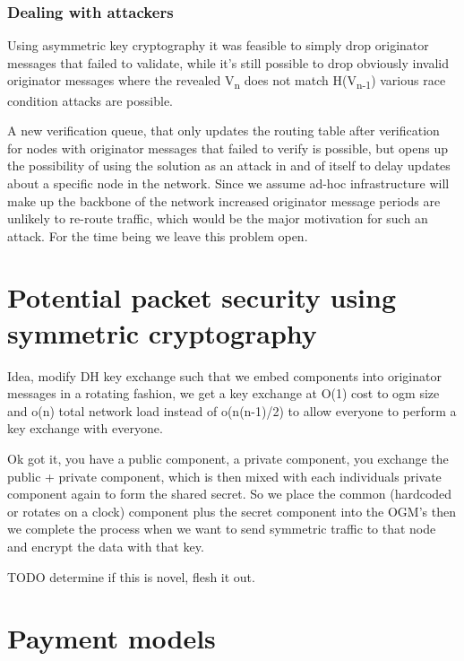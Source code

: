 \documentclass[11pt]{article}
\begin{document}
               \subsubsection{Dealing with attackers}
               
                      Using asymmetric key cryptography it was feasible to simply drop originator messages that failed to validate, while it's still possible to drop obviously invalid originator messages where the revealed V\textsubscript{n} does not match H(V\textsubscript{n-1}) various race condition attacks are possible. 
                          
                      A new verification queue, that only updates the routing table after verification for nodes with originator messages that failed to verify is possible, but opens up the possibility of using the solution as an attack in and of itself to delay updates about a specific node in the network. Since we assume ad-hoc infrastructure will make up the backbone of the network increased originator message periods are unlikely to re-route traffic, which would be the major motivation for such an attack. For the time being we leave this problem open.
                      
                      
\section {Potential packet security using symmetric cryptography}

    Idea, modify DH key exchange such that we embed components into originator messages in a rotating fashion, we get a key exchange at O(1) cost to ogm size and o(n) total network load instead of o(n(n-1)/2) to allow everyone to perform a key exchange with everyone.
                
                Ok got it, you have a public component, a private component, you exchange the public + private component, which is then mixed with each individuals private component again to form the shared secret. So we place the common (hardcoded or rotates on a clock) component plus the secret component into the OGM's then we complete the process when we want to send symmetric traffic to that node and encrypt the data with that key.
                
                TODO determine if this is novel, flesh it out. 
                
\section{Payment models} \label{pay}
\end{document}
